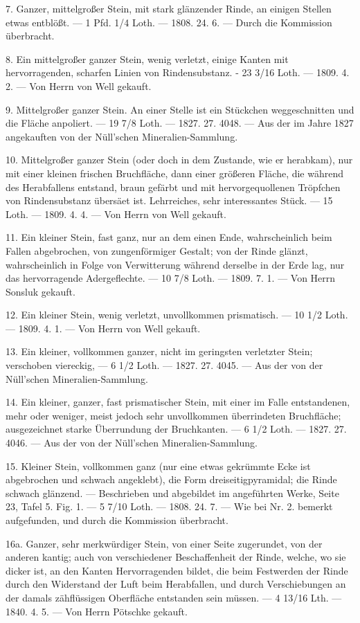 \documentclass[a4paper, 11pt, oneside, polutonikogreek, german]{article}
\begin{document}
7. Ganzer, mittelgroßer Stein, mit stark glänzender Rinde, an einigen Stellen etwas entblößt. — 1 Pfd. 1/4 Loth. — 1808. 24. 6. — Durch die Kommission überbracht.

8. Ein mittelgroßer ganzer Stein, wenig verletzt, einige Kanten mit hervorragenden, scharfen Linien von Rindensubstanz. - 23 3/16 Loth. — 1809. 4. 2. — Von Herrn von Well gekauft.

9. Mittelgroßer ganzer Stein. An einer Stelle ist ein Stückchen weggeschnitten und die Fläche anpoliert. — 19 7/8 Loth. — 1827. 27. 4048. — Aus der im Jahre 1827 angekauften von der Nüll’schen Mineralien-Sammlung.

10. Mittelgroßer ganzer Stein (oder doch in dem Zustande, wie er herabkam), nur mit einer kleinen frischen Bruchfläche, dann einer größeren Fläche, die während des Herabfallens entstand, braun gefärbt und mit hervorgequollenen Tröpfchen von Rindensubstanz übersäet ist. Lehrreiches, sehr interessantes Stück. — 15 Loth. — 1809. 4. 4. — Von Herrn von Well gekauft.

11. Ein kleiner Stein, fast ganz, nur an dem einen Ende, wahrscheinlich beim Fallen abgebrochen, von zungenförmiger Gestalt; von der Rinde glänzt, wahrscheinlich in Folge von Verwitterung während derselbe in der Erde lag, nur das hervorragende Adergeflechte. — 10 7/8 Loth. — 1809. 7. 1. — Von Herrn Sonsluk gekauft.

12. Ein kleiner Stein, wenig verletzt, unvollkommen prismatisch. — 10 1/2 Loth. — 1809. 4. 1. — Von Herrn von Well gekauft.

13. Ein kleiner, vollkommen ganzer, nicht im geringsten verletzter Stein; verschoben viereckig, — 6 1/2 Loth. — 1827. 27. 4045. — Aus der von der Nüll’schen Mineralien-Sammlung.

14. Ein kleiner, ganzer, fast prismatischer Stein, mit einer im Falle entstandenen, mehr oder weniger, meist jedoch sehr unvollkommen überrindeten Bruchfläche; ausgezeichnet starke Überrundung der Bruchkanten. — 6 1/2 Loth. — 1827. 27. 4046. — Aus der von der Nüll’schen Mineralien-Sammlung.

15. Kleiner Stein, vollkommen ganz (nur eine etwas gekrümmte Ecke ist abgebrochen und schwach angeklebt), die Form dreiseitigpyramidal; die Rinde schwach glänzend. — Beschrieben und abgebildet im angeführten Werke, Seite 23, Tafel 5. Fig. 1. — 5 7/10 Loth. — 1808. 24. 7. — Wie bei Nr. 2. bemerkt aufgefunden, und durch die Kommission überbracht.

16a. Ganzer, sehr merkwürdiger Stein, von einer Seite zugerundet, von der anderen kantig; auch von verschiedener Beschaffenheit der Rinde, welche, wo sie dicker ist, an den Kanten Hervorragenden bildet, die beim Festwerden der Rinde durch den Widerstand der Luft beim Herabfallen, und durch Verschiebungen an der damals zähflüssigen Oberfläche entstanden sein müssen. — 4 13/16 Lth. — 1840. 4. 5. — Von Herrn Pötschke gekauft. 
\end{document}
